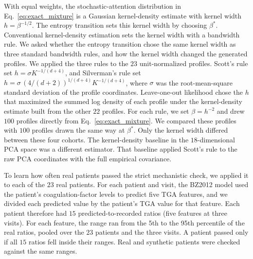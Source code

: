 With equal weights, the stochastic-attention distribution in
Eq.~\eqref{eq:exact_mixture} is a Gaussian kernel-density estimate with kernel width
$h=\beta^{-1/2}$. The entropy transition sets this kernel width by choosing $\beta^*$.
Conventional kernel-density estimation sets the kernel width with a bandwidth rule. We asked
whether the entropy transition chose the same kernel width as three standard bandwidth rules,
and how the kernel width changed the generated profiles. We applied the three rules to the
$23$ unit-normalized profiles. Scott's rule set $h=\sigma K^{-1/(d+4)}$, and Silverman's rule
set $h=\sigma\,(4/(d+2))^{1/(d+4)}K^{-1/(d+4)}$, where $\sigma$ was the root-mean-square
standard deviation of the profile coordinates. Leave-one-out likelihood chose the $h$ that
maximized the summed log density of each profile under the kernel-density estimate built from
the other $22$ profiles. For each rule, we set $\beta=h^{-2}$ and drew $100$ profiles directly
from Eq.~\eqref{eq:exact_mixture}. We compared these profiles with $100$ profiles drawn the
same way at $\beta^*$. Only the kernel width differed between these four cohorts. The
kernel-density baseline in the $18$-dimensional PCA space was a different estimator. That
baseline applied Scott's rule to the raw PCA coordinates with the full empirical covariance.

To learn how often real patients passed the strict mechanistic check, we applied it to
each of the $23$ real patients. For each patient and visit, the BZ2012 model used the patient's
coagulation-factor levels to predict five TGA features, and we divided each predicted value by
the patient's TGA value for that feature. Each patient therefore had $15$ predicted-to-recorded
ratios (five features at three visits). For each feature, the range ran from the 5th to the
95th percentile of the real ratios, pooled over the $23$ patients and the three visits. A
patient passed only if all $15$ ratios fell inside their ranges. Real and synthetic patients
were checked against the same ranges.

